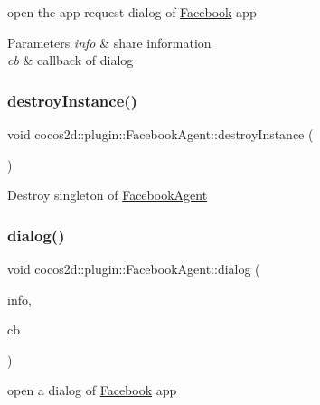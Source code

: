 open the app request dialog of \hyperlink{interfaceFacebook}{Facebook} app 


\begin{DoxyParams}{Parameters}
{\em info} & share information \\
\hline
{\em cb} & callback of dialog \\
\hline
\end{DoxyParams}
\mbox{\label{classcocos2d_1_1plugin_1_1FacebookAgent_a5017a07b6249969ba7cf3beb546b189f}} 
\subsubsection{\texorpdfstring{destroy\+Instance()}{destroyInstance()}}
{\footnotesize\ttfamily void cocos2d\+::plugin\+::\+Facebook\+Agent\+::destroy\+Instance (\begin{DoxyParamCaption}{ }\end{DoxyParamCaption})\hspace{0.3cm}{\ttfamily [static]}}

Destroy singleton of \hyperlink{classcocos2d_1_1plugin_1_1FacebookAgent}{Facebook\+Agent} \mbox{\label{classcocos2d_1_1plugin_1_1FacebookAgent_a7eb8857da590bc99adbff85d215f89a7}} 
\subsubsection{\texorpdfstring{dialog()}{dialog()}}
{\footnotesize\ttfamily void cocos2d\+::plugin\+::\+Facebook\+Agent\+::dialog (\begin{DoxyParamCaption}\item[{F\+B\+Info \&}]{info,  }\item[{F\+B\+Callback}]{cb }\end{DoxyParamCaption})}



open a dialog of \hyperlink{interfaceFacebook}{Facebook} app 


